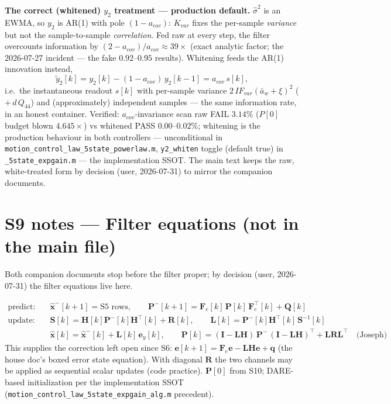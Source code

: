 \documentclass[11pt,a4paper,fontset=none]{ctexart}
\begin{document}
\textbf{The correct (whitened) $y_2$ treatment --- production default.}
$\hat{\sigma}^2$ is an EWMA, so $y_2$ is AR(1) with pole $(1-a_{cov})$:
$K_{var}$ fixes the per-sample \emph{variance} but not the
sample-to-sample \emph{correlation}.  Fed raw at every step, the filter
overcounts information by $(2-a_{cov})/a_{cov} \approx 39\times$ (exact
analytic factor; the 2026-07-27 incident --- the fake $0.92$--$0.95$
results).  Whitening feeds the AR(1) innovation instead,
\begin{equation*}
\tilde{y}_2[k] = y_2[k] - (1-a_{cov})\,y_2[k-1] = a_{cov}\,s[k],
\end{equation*}
i.e.\ the instantaneous readout $s[k]$ with per-sample variance
$2\,IF_{var}(\bar{a}_w+\xi)^2$ ($+\,d\,Q_{44}$) and (approximately)
independent samples --- the same information rate, in an honest
container.  Verified: $a_{cov}$-invariance scan raw FAIL $3.14\%$
($P[0]$ budget blown $4.645\times$) vs whitened PASS $0.00$--$0.02\%$;
whitening is the production behaviour in both controllers ---
unconditional in \texttt{motion\_control\_law\_5state\_powerlaw.m},
\texttt{y2\_whiten} toggle (default true) in
\texttt{\_5state\_expgain.m} --- the implementation SSOT.  The main text
keeps the raw, white-treated form by decision (user, 2026-07-31) to
mirror the companion documents.

\section*{S9 notes --- Filter equations (not in the main file)}

Both companion documents stop before the filter proper; by decision
(user, 2026-07-31) the filter equations live here.

\begin{align*}
\text{predict:}\quad
&\hat{\mathbf{x}}^-[k+1] = \text{S5 rows}, \qquad
\mathbf{P}^-[k+1] = \mathbf{F}_e[k]\,\mathbf{P}[k]\,\mathbf{F}_e^{\top}[k]
  + \mathbf{Q}[k] \\
\text{update:}\quad
&\mathbf{S}[k] = \mathbf{H}[k]\mathbf{P}^-[k]\mathbf{H}^{\top}[k]
  + \mathbf{R}[k], \qquad
\mathbf{L}[k] = \mathbf{P}^-[k]\mathbf{H}^{\top}[k]\,\mathbf{S}^{-1}[k] \\
&\hat{\mathbf{x}}[k] = \hat{\mathbf{x}}^-[k] + \mathbf{L}[k]\,\mathbf{e}_y[k],
\qquad
\mathbf{P}[k] = (\mathbf{I}-\mathbf{L}\mathbf{H})\,\mathbf{P}^-\,
  (\mathbf{I}-\mathbf{L}\mathbf{H})^{\top}
  + \mathbf{L}\mathbf{R}\mathbf{L}^{\top}
\quad \text{(Joseph)}
\end{align*}
This supplies the correction left open since S6:
$\mathbf{e}[k+1] = \mathbf{F}_e\mathbf{e} - \mathbf{L}\mathbf{H}\mathbf{e}
+ \mathbf{q}$ (the house doc's boxed error state equation).  With diagonal
$\mathbf{R}$ the two channels may be applied as sequential scalar updates
(code practice).  $\mathbf{P}[0]$ from S10; DARE-based initialization per
the implementation SSOT (\texttt{motion\_control\_law\_5state\_expgain\_alg.m}
precedent).
\end{document}
